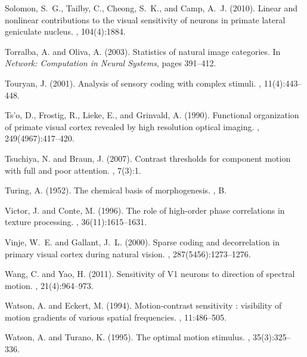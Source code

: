 \documentclass[a4paper,11pt]{article}%
\begin{document}
\begin{thebibliography}{}
Solomon, S.~G., Tailby, C., Cheong, S.~K., and Camp, A.~J. (2010).
\newblock Linear and nonlinear contributions to the visual sensitivity of
  neurons in primate lateral geniculate nucleus.
, 104(4):1884.

Torralba, A. and Oliva, A. (2003).
\newblock Statistics of natural image categories.
\newblock In {\em Network: Computation in Neural Systems}, pages 391--412.

Touryan, J. (2001).
\newblock Analysis of sensory coding with complex stimuli.
, 11(4):443--448.

Ts'o, D., Frostig, R., Lieke, E., and Grinvald, A. (1990).
\newblock Functional organization of primate visual cortex revealed by high
  resolution optical imaging.
, 249(4967):417--420.

Tsuchiya, N. and Braun, J. (2007).
\newblock Contrast thresholds for component motion with full and poor
  attention.
, 7(3):1.

Turing, A. (1952).
\newblock The chemical basis of morphogenesis.
, B.

Victor, J. and Conte, M. (1996).
\newblock The role of high-order phase correlations in texture processing.
, 36(11):1615--1631.

Vinje, W.~E. and Gallant, J.~L. (2000).
\newblock Sparse coding and decorrelation in primary visual cortex during
  natural vision.
, 287(5456):1273--1276.

Wang, C. and Yao, H. (2011).
\newblock Sensitivity of {V1} neurons to direction of spectral motion.
, 21(4):964--973.

Watson, A. and Eckert, M. (1994).
\newblock Motion-contrast sensitivity : visibility of motion gradients of
  various spatial frequencies.
, 11:486--505.

Watson, A. and Turano, K. (1995).
\newblock The optimal motion stimulus.
, 35(3):325--336.


\end{thebibliography}
\end{document}
